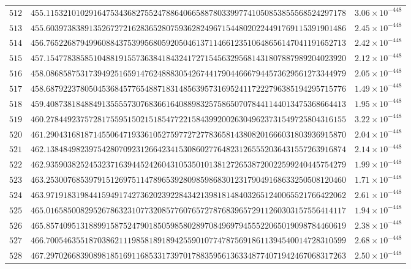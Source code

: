 \documentclass[12pt,reqno]{amsart}
\theoremstyle{remark}
\begin{document}
\begin{longtable}{clc}
$512$ & $455.1153210102916475343682755247886406658878033997741050853855568524297178$ & $3.06\times 10^{-448}$ \\
$513$ & $455.6039738389135267272162836528075936282496715448020224491769115391901486$ & $2.45\times 10^{-448}$ \\
$514$ & $456.7652268794996088437539956805920504613711466123510648656147041191652713$ & $2.42\times 10^{-448}$ \\
$515$ & $457.1547783858510488191557363841843241727154563295681431807887989204023920$ & $2.12\times 10^{-448}$ \\
$516$ & $458.0868587531739492516591476248883054267441790446667944573629561273344979$ & $2.05\times 10^{-448}$ \\
$517$ & $458.6879223780504536845776548871831485639573169524117222796385194295715776$ & $1.49\times 10^{-448}$ \\
$518$ & $459.4087381848849135555730768366164088983257586507078441144013475368664413$ & $1.95\times 10^{-448}$ \\
$519$ & $460.2784492375728175595150215185477221584399200263049623731549725804316155$ & $3.22\times 10^{-448}$ \\
$520$ & $461.2904316818714550647193361052759772727783658143808201666031803936915870$ & $2.04\times 10^{-448}$ \\
$521$ & $462.1384849823975428070923126642341530860277648231265552036431557263916874$ & $2.14\times 10^{-448}$ \\
$522$ & $462.9359038252453237163944524260431053501013812726538720022599240445754279$ & $1.99\times 10^{-448}$ \\
$523$ & $463.2530076853979151269751147896539280985986830123179049168633250508120460$ & $1.71\times 10^{-448}$ \\
$524$ & $463.9719183198441594917427362023922843421398181484032651240065521766422062$ & $2.61\times 10^{-448}$ \\
$525$ & $465.0165850082952678632310773208577607657278768396572911260303157556414117$ & $1.94\times 10^{-448}$ \\
$526$ & $465.8574095131889915875247901850598580289708496979455522065019098784460619$ & $2.38\times 10^{-448}$ \\
$527$ & $466.7005463551870386211198581891894255901077478756918611394540014728310599$ & $2.68\times 10^{-448}$ \\
$528$ & $467.2970266839089818516911685331739701788359561363348774071942467068317263$ & $2.50\times 10^{-448}$ \\

\end{longtable}
\end{document}
